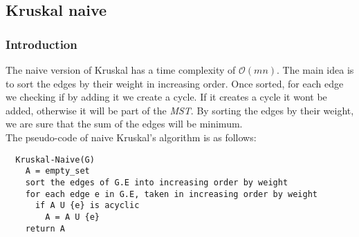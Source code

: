 \subsection{Kruskal naive}
\subsubsection{Introduction}
The naive version of Kruskal has a time complexity of $\mathcal{O}(mn)$. The main idea is to sort the edges by 
their weight in increasing order.
Once sorted, for each edge we checking if by adding it we create a cycle. If it creates a cycle it wont be 
added, otherwise it will be part of the \textit{MST}. By sorting the edges by their weight, we are sure that the sum of the
edges will be minimum. \\

\noindent
The pseudo-code of naive Kruskal's algorithm is as follows:
\begin{verbatim}
  Kruskal-Naive(G)
    A = empty_set
    sort the edges of G.E into increasing order by weight
    for each edge e in G.E, taken in increasing order by weight
      if A U {e} is acyclic
        A = A U {e}
    return A
\end{verbatim}
